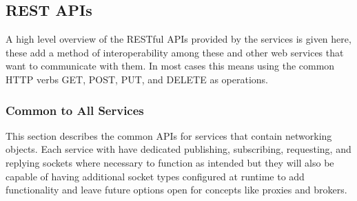 



  \subsection{REST APIs}\label{sec:rest}

    A high level overview of the RESTful APIs provided by the services is given
    here, these add a method of interoperability among these and other web
    services that want to communicate with them. In most cases this means using
    the common HTTP verbs GET, POST, PUT, and DELETE as operations.

    \subsubsection{Common to All Services}\label{sec:rest-common}

      This section describes the common APIs for services that contain
      networking objects. Each service with have dedicated publishing,
      subscribing, requesting, and replying sockets where necessary to function
      as intended but they will also be capable of having additional socket
      types configured at runtime to add functionality and leave future options
      open for concepts like proxies and brokers.

